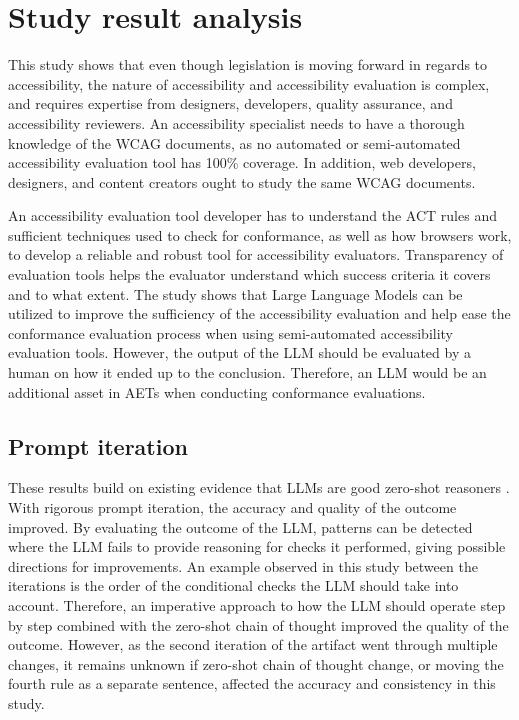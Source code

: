 \section{Study result analysis}

This study shows that even though legislation is moving forward in regards to accessibility, the nature of accessibility and accessibility evaluation is complex, and requires expertise from designers, developers, quality assurance, and accessibility reviewers. An accessibility specialist needs to have a thorough knowledge of the WCAG documents, as no automated or semi-automated accessibility evaluation tool has 100\% coverage. In addition, web developers, designers, and content creators ought to study the same WCAG documents.

An accessibility evaluation tool developer has to understand the ACT rules and sufficient techniques used to check for conformance, as well as how browsers work, to develop a reliable and robust tool for accessibility evaluators. Transparency of evaluation tools helps the evaluator understand which success criteria it covers and to what extent. The study shows that Large Language Models can be utilized to improve the sufficiency of the accessibility evaluation and help ease the conformance evaluation process when using semi-automated accessibility evaluation tools. However, the output of the LLM should be evaluated by a human on how it ended up to the conclusion. Therefore, an LLM would be an additional asset in AETs when conducting conformance evaluations.

\subsection{Prompt iteration}

These results build on existing evidence that LLMs are good zero-shot reasoners \citep{kojima2023large}. With rigorous prompt iteration, the accuracy and quality of the outcome improved. By evaluating the outcome of the LLM, patterns can be detected where the LLM fails to provide reasoning for checks it performed, giving possible directions for improvements. An example observed in this study between the iterations is the order of the conditional checks the LLM should take into account. Therefore, an imperative approach to how the LLM should operate step by step combined with the zero-shot chain of thought improved the quality of the outcome. However, as the second iteration of the artifact went through multiple changes, it remains unknown if \textcite{kojima2023large} zero-shot chain of thought change, or moving the fourth rule as a separate sentence, affected the accuracy and consistency in this study.

